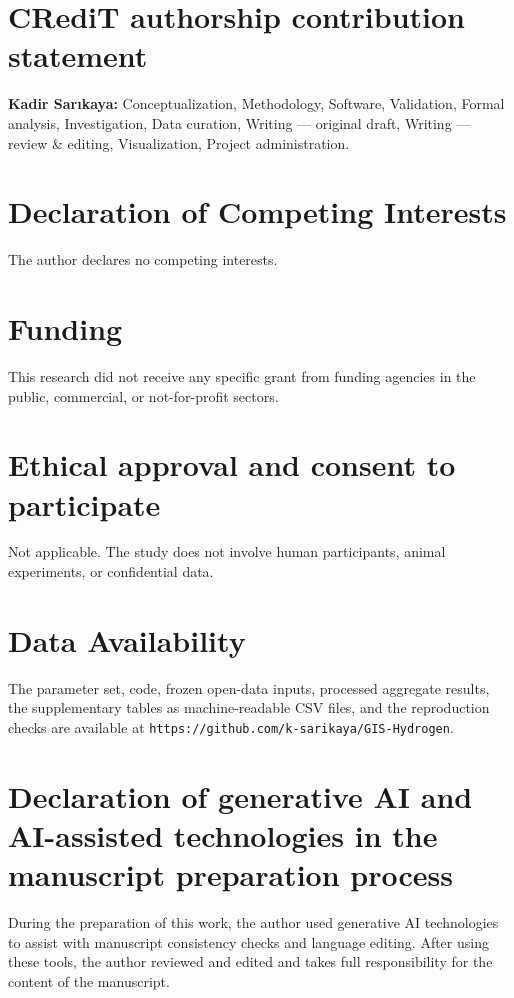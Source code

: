 \documentclass[preprint,12pt,authoryear]{elsarticle}
\begin{document}
\section*{CRediT authorship contribution statement}
\textbf{Kadir Sarıkaya:} Conceptualization, Methodology, Software, Validation, Formal analysis, Investigation, Data curation, Writing --- original draft, Writing --- review \& editing, Visualization, Project administration.

\section*{Declaration of Competing Interests}
The author declares no competing interests.

\section*{Funding}
This research did not receive any specific grant from funding agencies in the public, commercial, or not-for-profit sectors.

\section*{Ethical approval and consent to participate}
Not applicable. The study does not involve human participants, animal experiments, or confidential data.

\section*{Data Availability}
The parameter set, code, frozen open-data inputs, processed aggregate results, the supplementary tables as machine-readable CSV files, and the reproduction checks are available at \texttt{https://github.com/k-sarikaya/GIS-Hydrogen}. 

\section*{Declaration of generative AI and AI-assisted technologies in the manuscript preparation process}
During the preparation of this work, the author used generative AI technologies to assist with manuscript consistency checks and language editing. After using these tools, the author reviewed and edited and takes full responsibility for the content of the manuscript.
\end{document}
